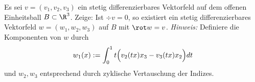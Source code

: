 \begin{prob}
Es sei $v=(v_1,v_2,v_3)$ ein stetig differenzierbares Vektorfeld auf dem offenen Einheitsball $B\subset\R^3$. Zeige: Ist $\div v=0$, so existiert ein stetig differenzierbares Vektorfeld $w=(w_1,w_2,w_3)$ auf $B$ mit $\rot w=v$. {\it Hinweis: }Definiere die Komponenten von $w$ durch
$$
   w_1(x) := \int_0^1 t\Bigl(v_2(tx)x_3-v_3(tx)x_2\Bigr)dt
$$
und $w_2,w_3$ entsprechend durch zyklische Vertauschung der Indizes.
\end{prob}
